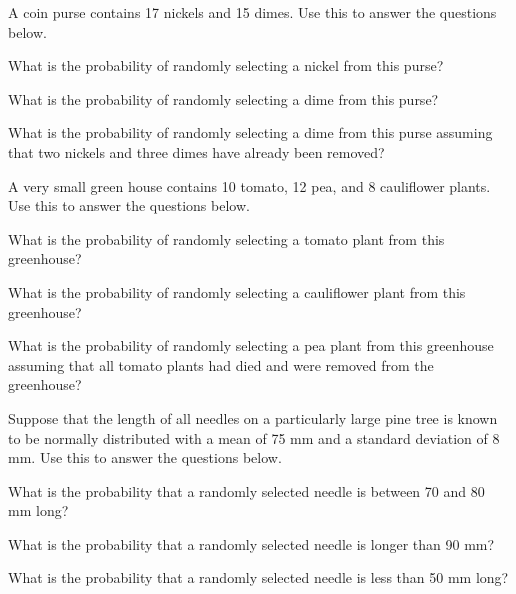 \documentclass[10pt,openany]{book}\usepackage[]{graphicx}\usepackage[]{color}
\begin{document}
\begin{exsection}
  \item \label{revex:ProbCoin} A coin purse contains 17 nickels and 15 dimes.  Use this to answer the questions below. 
  \begin{Enumerate}
    \item What is the probability of randomly selecting a nickel from this purse?
    \item What is the probability of randomly selecting a dime from this purse?
    \item What is the probability of randomly selecting a dime from this purse assuming that two nickels and three dimes have already been removed?
  \end{Enumerate}

  \item \label{revex:ProbGHouse} A very small green house contains 10 tomato, 12 pea, and 8 cauliflower plants.  Use this to answer the questions below. 
  \begin{Enumerate}
    \item What is the probability of randomly selecting a tomato plant from this greenhouse?
    \item What is the probability of randomly selecting a cauliflower plant from this greenhouse?
    \item What is the probability of randomly selecting a pea plant from this greenhouse assuming that all tomato plants had died and were removed from the greenhouse?
  \end{Enumerate}

  \item \label{revex:ProbPine} \rhw{} Suppose that the length of all needles on a particularly large pine tree is known to be normally distributed with a mean of 75 mm and a standard deviation of 8 mm.  Use this to answer the questions below. 
  \begin{Enumerate}
    \item What is the probability that a randomly selected needle is between 70 and 80 mm long?
    \item What is the probability that a randomly selected needle is longer than 90 mm?
    \item What is the probability that a randomly selected needle is less than 50 mm long?
  \end{Enumerate}
\end{exsection}
\end{document}
